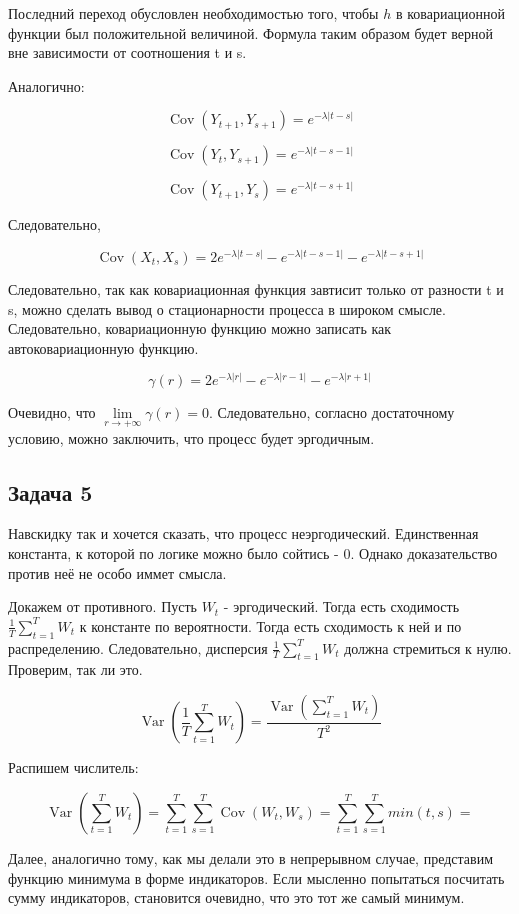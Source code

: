\documentclass[a4paper,12pt]{article}
\def \cov{{\operatorname{Cov}}}
\DeclareMathOperator{\Var}{Var}
\DeclareMathOperator{\Cov}{Cov}
\begin{document}
Последний переход обусловлен необходимостью того, чтобы $ h $ в ковариационной функции был положительной величиной. Формула таким образом будет верной вне зависимости от соотношения t и s.

Аналогично:

\[ \Cov(Y_{t+1}, Y_{s+1})  =  e^{-\lambda |t-s|}\]


\[  \Cov(Y_t, Y_{s+1})  =  e^{-\lambda |t-s - 1|} \]

\[  \Cov(Y_{t+1}, Y_{s})  =  e^{-\lambda |t-s + 1|} \]


Следовательно, 

\[  \Cov(X_t, X_s) = 2 e^{-\lambda |t-s|} -  e^{-\lambda |t-s - 1|} -  e^{-\lambda |t-s + 1|}\]

Следовательно, так как ковариационная функция завтисит только от разности t и s, можно сделать вывод о стационарности процесса в широком смысле. Следовательно, ковариационную функцию можно записать как автоковариационную функцию.

\[ \gamma(r) = 2e^{-\lambda |r|} -  e^{-\lambda |r - 1|} -  e^{-\lambda |r + 1|}  \]

Очевидно, что $ \lim\limits_{r \to +\infty} \gamma(r) = 0 $. Следовательно, согласно достаточному условию, можно заключить, что процесс будет эргодичным.
\subsection{Задача 5}

Навскидку так и хочется сказать, что процесс неэргодический. Единственная константа, к которой по логике можно было сойтись - 0. Однако доказательство против неё не особо иммет смысла. 

Докажем от противного. Пусть $ W_t $ - эргодический. Тогда есть сходимость $ \frac{1}{T}\sum_{t=1}^{T} W_t $ к константе по вероятности. Тогда есть сходимость к ней и по распределению. Следовательно, дисперсия $\frac{1}{T}\sum_{t=1}^{T} W_t $ должна стремиться к нулю. Проверим, так ли это.

\[ \Var(\frac{1}{T}\sum_{t=1}^{T} W_t) = \frac{\Var(\sum_{t=1}^{T} W_t)}{T^2} \]

Распишем числитель:

\[ \Var(\sum_{t=1}^{T} W_t)  = \sum_{t = 1}^{T} \sum_{s = 1}^{T} \cov(W_t, W_s) =  \sum_{t = 1}^{T} \sum_{s = 1}^{T} min(t,s) =  \]

Далее, аналогично тому, как мы делали это в непрерывном случае, представим функцию минимума в форме индикаторов. Если мысленно попытаться посчитать сумму индикаторов, становится очевидно, что это тот же самый минимум.
\end{document}
